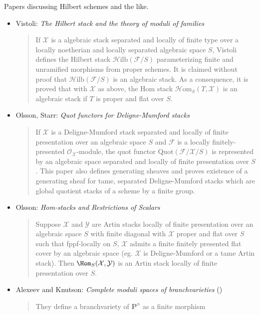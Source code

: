 \noindent
Papers discussing Hilbert schemes and the like.
\begin{itemize}
\item Vistoli: \emph{The Hilbert stack and the theory of moduli of families}
\cite{vistoli_hilbert}
\begin{quote}
If $\mathcal{X}$ is a algebraic stack separated and locally of finite type
over a locally noetherian and locally separated algebraic space $S$, Vistoli
defines the Hilbert stack $\mathcal{H}\text{ilb}(\mathcal{F} / S)$
parameterizing finite and unramified morphisms from proper schemes.
It is claimed without proof that $\mathcal{H}\text{ilb}(\mathcal{F} / S)$
is an algebraic stack. As a consequence, it is proved that with $\mathcal{X}$
as above, the Hom stack $\mathcal{H} \text{om}_S(T, \mathcal{X})$ is an
algebraic stack if $T$ is proper and flat over $S$.
\end{quote}
\item Olsson, Starr: \emph{Quot functors for Deligne-Mumford stacks}
\cite{olsson-starr}
\begin{quote}
If $\mathcal{X}$ is a Deligne-Mumford stack separated and locally of finite
presentation over an algebraic space $S$ and $\mathcal{F}$ is a locally
finitely-presented $\mathcal{O}_\mathcal{X}$-module, the quot functor
$\text{Quot}(\mathcal{F} / \mathcal{X} / S)$ is represented by an algebraic
space separated and locally of finite presentation over $S$. This paper
also defines generating sheaves and proves existence of a generating sheaf
for tame, separated Deligne-Mumford stacks which are global quotient stacks
of a scheme by a finite group.
\end{quote}
\item Olsson: \emph{Hom-stacks and Restrictions of Scalars}
\cite{olsson_homstacks}
\begin{quote}
Suppose $\mathcal{X}$ and $\mathcal{Y}$ are Artin stacks locally of finite
presentation over an algebraic space $S$ with finite diagonal with
$\mathcal{X}$ proper and flat over $S$ such that fppf-locally on $S$,
$\mathcal{X}$ admits a finite finitely presented flat cover by an algebraic
space (eg. $\mathcal{X}$ is Deligne-Mumford or a tame Artin stack).
Then $\Hom_S(\mathcal{X}, \mathcal{Y})$ is an Artin stack locally
of finite presentation over $S$.
\end{quote}
\item Alexeev and Knutson: \emph{Complete moduli spaces of branchvarieties}
(\cite{alexeev-knutson})
\begin{quote}
They define a branchvariety of $\mathbf{P}^n$ as a finite morphism

\end{quote}
\end{itemize}
